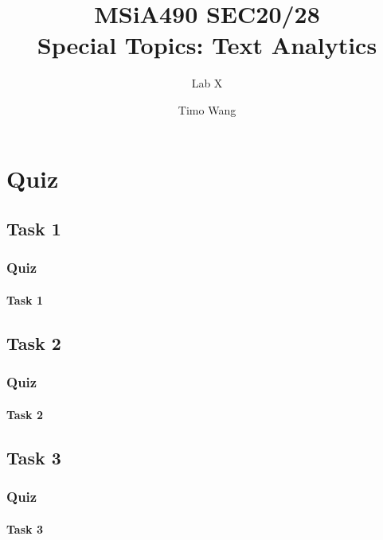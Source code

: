 \documentclass{beamer}
\begin{document}
\title{MSiA490 SEC20/28\\ Special Topics: Text Analytics}
\subtitle{Lab X}
\author{Timo Wang}

\titlepage

\section{Quiz}
\subsection{Task 1}
\begin{frame}
    \frametitle{Quiz}
    \framesubtitle{Task 1}
\end{frame}

\subsection{Task 2}
\begin{frame}
    \frametitle{Quiz}
    \framesubtitle{Task 2}
\end{frame}

\subsection{Task 3}
\begin{frame}
    \frametitle{Quiz}
    \framesubtitle{Task 3}
\end{frame}
\end{document}
